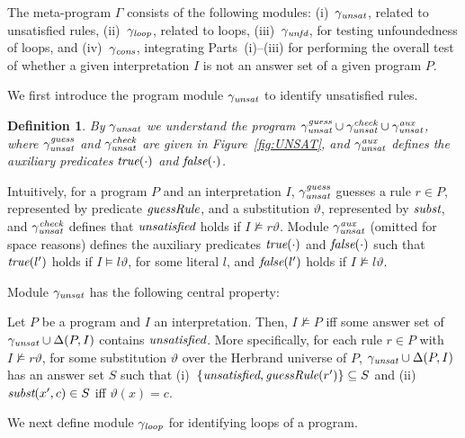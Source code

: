 \documentclass{tlp}
\newcommand{\meta}{\Gamma}
\newcommand{\reif}[1]{\Delta(#1)}
\newcommand{\subst}{\vartheta}
\newcommand{\INPUT}{\reif{P,I}}
\newcommand{\Unsat}{\mathit{UNSAT}} \newcommand{\UnsatGuess}{\mathit{UNSAT_{guess}}} \newcommand{\UnsatCheck}{\mathit{UNSAT_{check}}} \newcommand{\UnsatAux}{\mathit{UNSAT_{aux}}} \renewcommand{\Unsat}{\gamma_\mathit{unsat}} \renewcommand{\UnsatGuess}{\Unsat^\mathit{guess}} \renewcommand{\UnsatCheck}{\Unsat^\mathit{check}} \renewcommand{\UnsatAux}{\Unsat^\mathit{aux}}
\newcommand{\Loop}{\mathit{LOOP}} \newcommand{\LoopGuess}{\mathit{LOOP_{guess}}} \newcommand{\LoopCheck}{\mathit{LOOP_{check}}} \newcommand{\LoopAux}{\mathit{LOOP_{aux}}} \renewcommand{\Loop}{\gamma_\mathit{loop}} \renewcommand{\LoopGuess}{\Loop^\mathit{guess}} \renewcommand{\LoopCheck}{\Loop^\mathit{check}} \renewcommand{\LoopAux}{\Loop^\mathit{aux}}
\newcommand{\Support}{\mathit{SUPPORT}} \newcommand{\SupportGuess}{\mathit{SUPPORT_{guess}}} \newcommand{\SupportCheck}{\mathit{SUPPORT_{check}}} \newcommand{\SupportAux}{\mathit{SUPPORT_{aux}}} \renewcommand{\Support}{\gamma_\mathit{unfd}} \renewcommand{\SupportGuess}{\Support^\mathit{guess}} \renewcommand{\SupportCheck}{\Support^\mathit{check}} \renewcommand{\SupportAux}{\Support^\mathit{aux}}
\newcommand{\Cons}{\mathit{CONS}}
\renewcommand{\Cons}{\gamma_\mathit{cons}}
\renewcommand{\mathit}[1]{{\text{\it{#1}}}}
\newtheorem{definition}{Definition}
\begin{document}
The meta-program $\meta$ consists of the following modules:
(i)~$\Unsat$, related to unsatisfied rules,
(ii)~$\Loop$, related to loops,
(iii)~$\Support$, for testing unfoundedness of loops, and
(iv)~$\Cons$, integrating Parts~(i)--(iii) for performing the overall test of whether a given interpretation $I$ is not an answer set of 
a given program $P$.

We  first introduce the program module $\Unsat$ to identify unsatisfied rules. 

\begin{definition}\label{def:unsat}
By $\Unsat$ we understand the program 
$\UnsatGuess \cup \UnsatCheck \cup \UnsatAux$, where $\UnsatGuess$ and $\UnsatCheck$ are given in Figure~\ref{fig:UNSAT}, and $\UnsatAux$ defines the auxiliary predicates $\mathit{true}(\cdot)$ and $\mathit{false}(\cdot)$. 
\end{definition}


Intuitively, for a  program $P$ and an interpretation $I$, $\UnsatGuess$
guesses a rule $r \in P$, represented by predicate $\mathit{guessRule}$, 
and a substitution $\subst$, represented by $\mathit{subst}$, and
  $\UnsatCheck$ defines that
  $\mathit{unsatisfied}$ holds  if $I \not\models r\subst$. 
Module $\UnsatAux$ (omitted for space reasons) defines the auxiliary predicates $\mathit{true}(\cdot)$ and $\mathit{false}(\cdot)$ such that
$\mathit{true}(l')$ holds if $I \models l\subst$, for some literal $l$, and $\mathit{false}(l')$ holds if $I \not\models l\subst$.

Module $\Unsat$ has the following central property:

\begin{theorem}\label{thm:unsat}
Let $P$ be a program and $I$ an interpretation.
Then, $I \not\models P$ iff some answer set of $\Unsat \cup \INPUT$ contains $\mathit{unsatisfied}$.
More specifically,
for each rule  $r \in P$  with $I \not\models r\subst$, for some substitution $\subst$ over the Herbrand universe of $P$,
$\Unsat \cup \INPUT$ has an answer set $S$ such that
{\rm (}i{\rm )}~$\{\mathit{unsatisfied},\mathit{guessRule}(r')\}\subseteq S$ and
{\rm (}ii{\rm )}~$\mathit{subst}(x',c)\in S$ 
iff $\subst(x) = c$.
\end{theorem}


We next define  module $\Loop$ for identifying 
loops of a program.
\end{document}

